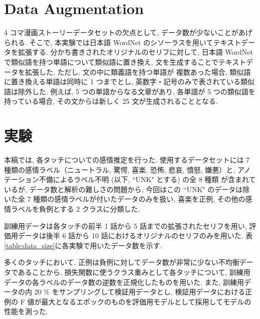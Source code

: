 \documentclass[twocolumn]{jarticle}     %
\begin{document}
\section{Data Augmentation}
4 コマ漫画ストーリーデータセットの欠点として, データ数が少ないことがあげられる. そこで, 本実験では日本語 WordNet \cite{word_net_jp} のシソーラスを用いてテキストデータを拡張する.
分かち書きされたオリジナルのセリフに対して, 日本語 WordNet で類似語を持つ単語について類似語に置き換え, 文を生成することでテキストデータを拡張した. ただし, 文の中に類義語を持つ単語が
複数あった場合, 類似語に置き換える単語は同時に 1 つまでとし, 英数字・記号のみで表されている類似語は除外した. 例えば, 5 つの単語からなる文章があり,
各単語が 5 つの類似語を持っている場合, その文からは新しく 25 文が生成されることとなる.

\section{実験}
本稿では, 各タッチについての感情推定を行った.
使用するデータセットには 7 種類の感情ラベル（ニュートラル, 驚愕, 喜楽, 恐怖, 悲哀, 憤怒, 嫌悪）と, アノテーション不備によるラベル不明 (以下, ``UNK" とする) の全 8 種類
が含まれているが, データ数と解析の難しさの問題から, 今回はこの ``UNK" のデータは除いた全 7 種類の感情ラベルが付いたデータのみを扱い, 喜楽を正例, その他の感情ラベルを負例とする 2 クラスに分類した.

訓練用データは各タッチの前半 1 話から 5 話までの拡張されたセリフを用い,
評価用データは後半 6 話から 10 話におけるオリジナルのセリフのみを用いた.
表\ref{table:data_size}に各実験で用いたデータ数を示す.

多くのタッチにおいて, 正例は負例に対してデータ数が非常に少ない不均衡データであることから, 損失関数に使うクラス重みとして各タッチについて, 訓練用データの各ラベルのデータ数の逆数を正規化したものを用いた. また, 訓練用データの内 20 \% をサンプリングして検証用データとし, 検証用データにおける正例の F 値が最大となるエポックのものを評価用モデルとして採用してモデルの性能を測った.
\end{document}
